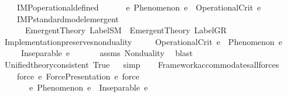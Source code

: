 \begin{isabellebody}
\ \ \ \ IMP{}{\isacharunderscore}{\kern0pt}operational{\isacharunderscore}{\kern0pt}defined{\isacharcolon}{\kern0pt}\isanewline
\ \ \ \ \ \ {\isachardoublequoteopen}{\isasymforall}e{\isachardot}{\kern0pt}\ Phenomenon\ e\ {\isasymlongrightarrow}\ OperationalCrit\ e{\isachardoublequoteclose}\ \isanewline
\ \ \ \ IMP{}{\isacharunderscore}{\kern0pt}standard{\isacharunderscore}{\kern0pt}model{\isacharunderscore}{\kern0pt}emergent{\isacharcolon}{\kern0pt}\isanewline
\ \ \ \ \ \ {\isachardoublequoteopen}EmergentTheory\ LabelSM\ {\isasymand}\ EmergentTheory\ LabelGR{\isachardoublequoteclose}\isanewline
\isanewline
\ \ \isamarkupfalse%
\ Implementation{\isacharunderscore}{\kern0pt}preserves{\isacharunderscore}{\kern0pt}nonduality{\isacharcolon}{\kern0pt}\isanewline
\ \ \ \ \ {\isachardoublequoteopen}OperationalCrit\ e{\isachardoublequoteclose}\ \ {\isachardoublequoteopen}Phenomenon\ e{\isachardoublequoteclose}\isanewline
\ \ \ \ \ {\isachardoublequoteopen}Inseparable\ e\ {\isasymOmega}{\isachardoublequoteclose}\isanewline
%
\isadelimproof
\ \ \ \ %
\endisadelimproof
%
\isatagproof
{}\isamarkupfalse%
\ assms\ Nonduality\ \isamarkupfalse%
\ blast%
\endisatagproof
{\isafoldproof}%
%
\isadelimproof
%
\endisadelimproof
%
\isadelimdocument
%
\endisadelimdocument
%
\isatagdocument
%
\isamarkuptrue%
%
\endisatagdocument
{\isafolddocument}%
%
\isadelimdocument
%
\endisadelimdocument
\ \ \isamarkupfalse%
\ Unified{\isacharunderscore}{\kern0pt}theory{\isacharunderscore}{\kern0pt}consistent{\isacharcolon}{\kern0pt}\ True%
\isadelimproof
\ %
\endisadelimproof
%
\isatagproof
{}\isamarkupfalse%
\ simp%
\endisatagproof
{\isafoldproof}%
%
\isadelimproof
%
\endisadelimproof
\isanewline
\isanewline
\ \ \isamarkupfalse%
\ Framework{\isacharunderscore}{\kern0pt}accommodates{\isacharunderscore}{\kern0pt}all{\isacharunderscore}{\kern0pt}forces{\isacharcolon}{\kern0pt}\isanewline
\ \ \ \ {\isachardoublequoteopen}{\isasymforall}force{\isachardot}{\kern0pt}\ {\isacharparenleft}{\kern0pt}{\isasymexists}e{\isachardot}{\kern0pt}\ ForcePresentation\ e\ force{\isacharparenright}{\kern0pt}\ {\isasymlongrightarrow}\isanewline
\ \ \ \ \ \ \ {\isacharparenleft}{\kern0pt}{\isasymexists}e{\isachardot}{\kern0pt}\ Phenomenon\ e\ {\isasymand}\ Inseparable\ e\ {\isasymOmega}{\isacharparenright}{\kern0pt}{\isachardoublequoteclose}\isanewline

\end{isabellebody}
